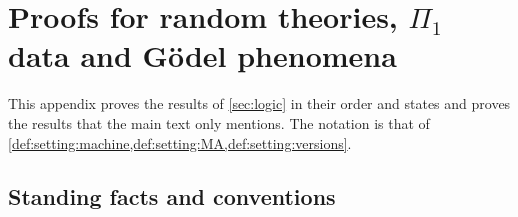 \section{Proofs for random theories, \texorpdfstring{$\Pi_1$}{Pi1} data and G\"odel phenomena}\label{app:logic}

This appendix proves the results of \cref{sec:logic} in their order and states and proves the results that the main text only mentions. The notation is that of \cref{def:setting:machine,def:setting:MA,def:setting:versions}.

\subsection{Standing facts and conventions}\label{app:logic:conv}

